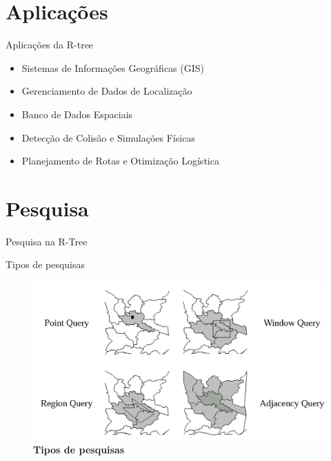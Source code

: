 \documentclass[compress,aspectratio=169]{beamer}
\begin{document}
\section{Aplicações}

\begin{frame}{Aplicações da R-tree}
    
    \begin{justify}
        \begin{itemize}
            \item Sistemas de Informações Geográficas (GIS)
            \item Gerenciamento de Dados de Localização
            \item Banco de Dados Espaciais
            \item Detecção de Colisão e Simulações Físicas
            \item Planejamento de Rotas e Otimização Logística
        \end{itemize}
    \end{justify}
\end{frame}

\section{Pesquisa}

\begin{frame}{Pesquisa na R-Tree}
    
    \begin{justify}
        \par Tipos de pesquisas
        \begin{figure}[] 
        \centering
        \includegraphics[width=0.71\linewidth]{buscas.png}
        \caption{\textbf{Tipos de pesquisas}}
        \label{fig:enter-label}
  
        \end{figure}
    \end{justify}
\end{frame}
\end{document}
